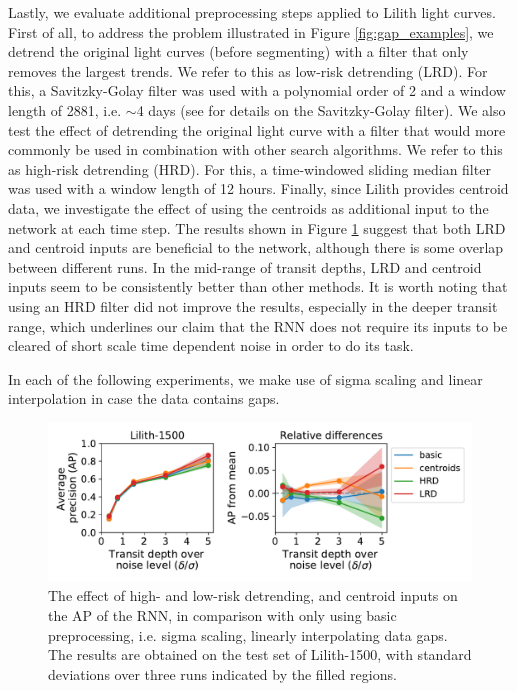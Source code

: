 Lastly, we evaluate additional preprocessing steps applied to Lilith light curves. First of all, to address the problem illustrated in Figure \ref{fig:gap_examples}, we detrend the original light curves (before segmenting) with a filter that only removes the largest trends. We refer to this as low-risk detrending (LRD). For this, a Savitzky-Golay filter was used with a polynomial order of 2 and a window length of 2881, i.e. $\sim$4 days (see \cite{hippke2019wotan} for details on the Savitzky-Golay filter). We also test the effect of detrending the original light curve with a filter that would more commonly be used in combination with other search algorithms. We refer to this as high-risk detrending (HRD). For this, a time-windowed sliding median filter was used with a window length of 12 hours. Finally, since Lilith provides centroid data, we investigate the effect of using the centroids as additional input to the network at each time step. The results shown in Figure \ref{fig:lilith_pp_advanced} suggest that both LRD and centroid inputs are beneficial to the network, although there is some overlap between different runs. In the mid-range of transit depths, LRD and centroid inputs seem to be consistently better than other methods. It is worth noting that using an HRD filter did not improve the results, especially in the deeper transit range, which underlines our claim that the RNN does not require its inputs to be cleared of short scale time dependent noise in order to do its task.

In each of the following experiments, we make use of sigma scaling and linear interpolation in case the data contains gaps.
\begin{figure}
    \centering
    \includegraphics[width=0.7\linewidth]{Experiments/Figures/Preprocessing/lilith1500_AP_pp-advanced.pdf}
    \caption{ The effect of high- and low-risk detrending, and centroid inputs on the AP of the RNN, in comparison with only using basic preprocessing, i.e. sigma scaling, linearly interpolating data gaps. The results are obtained on the test set of Lilith-1500, with standard deviations over three runs indicated by the filled regions. }
    \label{fig:lilith_pp_advanced}
\end{figure}
